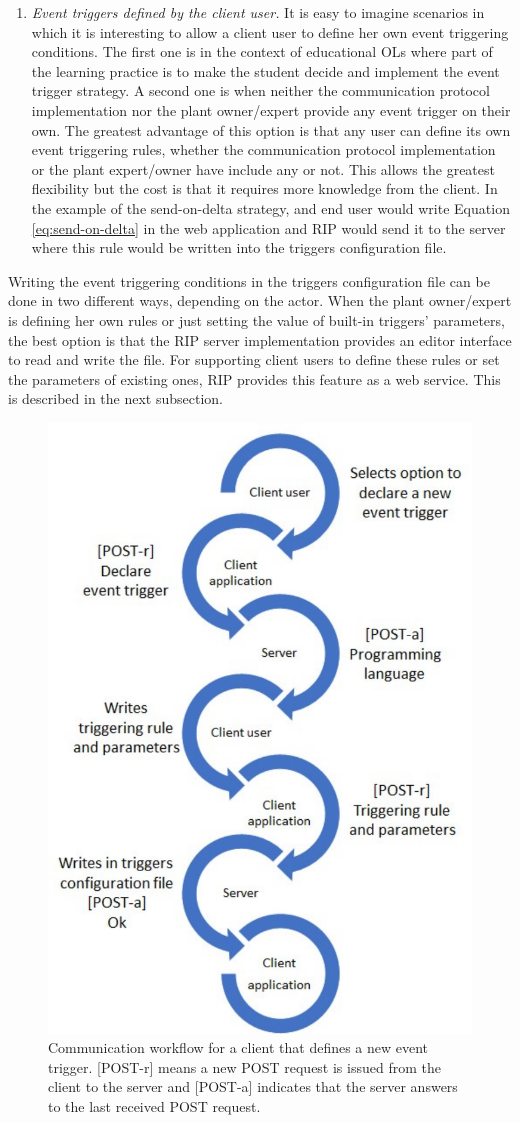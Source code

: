 \begin{enumerate}
	\item \textit{Event triggers defined by the client user.} It is easy to imagine scenarios in which it is interesting to allow a client user to define her own event triggering conditions. The first one is in the context of educational OLs where part of the learning practice is to make the student decide and implement the event trigger strategy. A second one is when neither the communication protocol implementation nor the plant owner/expert provide any event trigger on their own. The greatest advantage of this option is that any user can define its own event triggering rules, whether the communication protocol implementation or the plant expert/owner have include any or not. This allows the greatest flexibility but the cost is that it requires more knowledge from the client. In the example of the send-on-delta strategy, and end user would write Equation \ref{eq:send-on-delta} in the web application and RIP would send it to the server where this rule would be written into the triggers configuration file.
\end{enumerate}

Writing the event triggering conditions in the triggers configuration file can be done in two different ways, depending on the actor. When the plant owner/expert is defining her own rules or just setting the value of built-in triggers' parameters, the best option is that the RIP server implementation provides an editor interface to read and write the file. For supporting client users to define these rules or set the parameters of existing ones, RIP provides this feature as a web service. This is described in the next subsection.

\begin{figure}[b!]
\begin{center}
\centering
\includegraphics[width=0.4\columnwidth]{images/workflow_define.pdf}
\caption{Communication workflow for a client that defines a new event trigger. [POST-r] means a new POST request is issued from the client to the server and [POST-a] indicates that the server answers to the last received POST request.}
\label{fig:define_workflow}
\end{center}
\end{figure}

